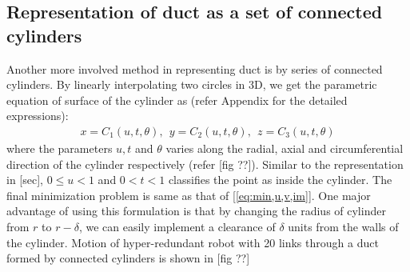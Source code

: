 \documentclass[12pt,a4]{article}
\begin{document}
\subsection{Representation of duct as a set of connected cylinders}
Another more involved method in representing duct is by series of connected cylinders. By linearly interpolating two circles in 3D, we get the parametric equation of surface of the cylinder as (refer Appendix for the detailed expressions):
\begin{align}
\label{eq:cylinder}
x = C_1(u,t,\theta),~~y = C_2(u,t,\theta),~~z = C_3(u,t,\theta)
\end{align}
where the parameters $u,t$ and $\theta$ varies along the radial, axial and circumferential direction of the cylinder respectively (refer [fig ??]). Similar to the representation in [sec], $0\leq u< 1$ and $0<t<1$ classifies the point as inside the cylinder. The final minimization problem is same as that of [\ref{eq:min,u,v,im}]. One major advantage of using this formulation is that by changing the radius of cylinder from $r$ to $r-\delta$, we can easily implement a clearance of $\delta$ units from the walls of the cylinder. Motion of hyper-redundant robot with 20 links through a duct formed by connected cylinders is shown in [fig ??]
\end{document}
